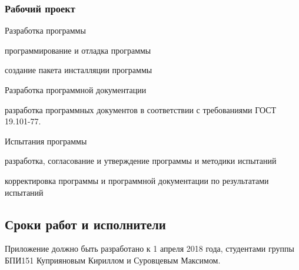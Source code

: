 \subsubsection{Рабочий проект}
\begin{my_enumerate}
    \item Разработка программы
        \begin{my_enumerate}
            \item программирование и отладка программы
            \item создание пакета инсталляции программы
        \end{my_enumerate}
    \item Разработка программной документации
        \begin{my_enumerate}
            \item разработка программных документов в соответствии с требованиями ГОСТ 19.101-77.
        \end{my_enumerate}
     \item Испытания программы
           \begin{my_enumerate}
             \item разработка, согласование и утверждение программы и методики испытаний
            \item корректировка программы и программной документации по результатами испытаний
         \end{my_enumerate}
\end{my_enumerate}

\subsection{Сроки работ и исполнители}

Приложение должно быть разработано к 1 апреля 2018 года, студентами группы БПИ151 
Куприяновым Кириллом и Суровцевым Максимом.


